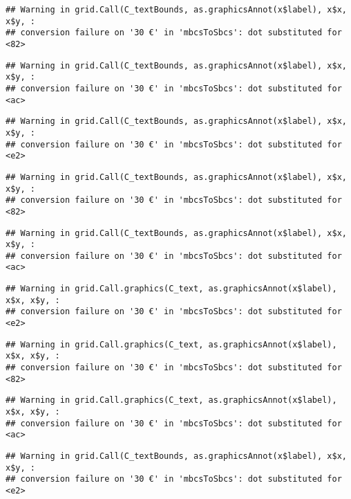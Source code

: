 \documentclass[
]{article}
\begin{document}
\begin{verbatim}
## Warning in grid.Call(C_textBounds, as.graphicsAnnot(x$label), x$x, x$y, :
## conversion failure on '30 €' in 'mbcsToSbcs': dot substituted for <82>
\end{verbatim}

\begin{verbatim}
## Warning in grid.Call(C_textBounds, as.graphicsAnnot(x$label), x$x, x$y, :
## conversion failure on '30 €' in 'mbcsToSbcs': dot substituted for <ac>
\end{verbatim}

\begin{verbatim}
## Warning in grid.Call(C_textBounds, as.graphicsAnnot(x$label), x$x, x$y, :
## conversion failure on '30 €' in 'mbcsToSbcs': dot substituted for <e2>
\end{verbatim}

\begin{verbatim}
## Warning in grid.Call(C_textBounds, as.graphicsAnnot(x$label), x$x, x$y, :
## conversion failure on '30 €' in 'mbcsToSbcs': dot substituted for <82>
\end{verbatim}

\begin{verbatim}
## Warning in grid.Call(C_textBounds, as.graphicsAnnot(x$label), x$x, x$y, :
## conversion failure on '30 €' in 'mbcsToSbcs': dot substituted for <ac>
\end{verbatim}

\begin{verbatim}
## Warning in grid.Call.graphics(C_text, as.graphicsAnnot(x$label), x$x, x$y, :
## conversion failure on '30 €' in 'mbcsToSbcs': dot substituted for <e2>
\end{verbatim}

\begin{verbatim}
## Warning in grid.Call.graphics(C_text, as.graphicsAnnot(x$label), x$x, x$y, :
## conversion failure on '30 €' in 'mbcsToSbcs': dot substituted for <82>
\end{verbatim}

\begin{verbatim}
## Warning in grid.Call.graphics(C_text, as.graphicsAnnot(x$label), x$x, x$y, :
## conversion failure on '30 €' in 'mbcsToSbcs': dot substituted for <ac>
\end{verbatim}

\begin{verbatim}
## Warning in grid.Call(C_textBounds, as.graphicsAnnot(x$label), x$x, x$y, :
## conversion failure on '30 €' in 'mbcsToSbcs': dot substituted for <e2>
\end{verbatim}
\end{document}
